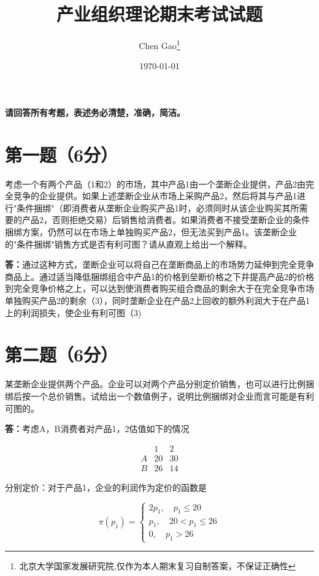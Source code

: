 \documentclass[12pt]{article}
\begin{document}
\title{产业组织理论期末考试试题}
\author{Chen Gao\thanks{北京大学国家发展研究院,仅作为本人期末复习自制答案，不保证正确性}}
\date{\today}
\maketitle




\medskip
\noindent\textbf{请回答所有考题，表述务必清楚，准确，简洁。}

\bigskip
\section*{第一题（6分）}
考虑一个有两个产品（1和2）的市场，其中产品1由一个垄断企业提供，产品2由完全竞争的企业提供。如果上述垄断企业从市场上采购产品2，然后将其与产品1进行"条件捆绑"（即消费者从垄断企业购买产品1时，必须同时从该企业购买其所需要的产品2，否则拒绝交易）后销售给消费者。如果消费者不接受垄断企业的条件捆绑方案，仍然可以在市场上单独购买产品2，但无法买到产品1。该垄断企业的"条件捆绑"销售方式是否有利可图？请从直观上给出一个解释。

\noindent\textbf{答：}通过这种方式，垄断企业可以将自己在垄断商品上的市场势力延伸到完全竞争商品上。通过适当降低捆绑组合中产品1的价格到垒断价格之下并提高产品2的价格到完全竞争价格之上，可以达到使消费者购买组合商品的剩余大于在完全竞争市场单独购买产品2的剩余（3），同时垄断企业在产品2上回收的额外利润大于在产品1上的利润损失，使企业有利可图（3)

\section*{第二题（6分）}
某垄断企业提供两个产品。企业可以对两个产品分别定价销售，也可以进行比例捆绑后按一个总价销售。试给出一个数值例子，说明比例捆绑对企业而言可能是有利可图的。

\noindent\textbf{答：}考虑A，B消费者对产品1，2估值如下的情况

$$\begin{array}{c|cc}&1&2\\\hline A&20&30\\[6pt]B&26&14\end{array}$$

分别定价：对于产品1，企业的利润作为定价的函数是

$$\pi(p_1)=\begin{cases}2p_1,\quad p_1\le20\\[2ex]p_1,\quad20<p_1\le26\\[2ex]0,\quad p_1>26\end{cases}$$
\end{document}
